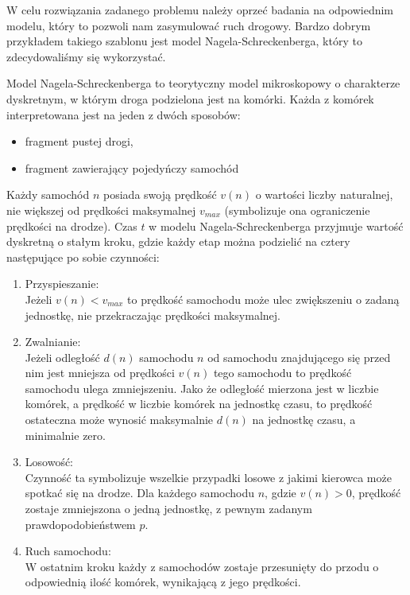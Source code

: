 \documentclass[a4paper,12pt]{article}
\begin{document}
	W celu rozwiązania zadanego problemu należy oprzeć badania na odpowiednim modelu, który to pozwoli nam zasymulować ruch drogowy. Bardzo dobrym przykładem takiego szablonu jest model Nagela-Schreckenberga, który to zdecydowaliśmy się wykorzystać.
	
	Model Nagela-Schreckenberga to teorytyczny model mikroskopowy o charakterze dyskretnym, w którym droga podzielona jest na komórki. Każda z komórek interpretowana jest na jeden z dwóch sposobów:
	
	\begin{itemize}
		\item fragment pustej drogi,
		\item fragment zawierający pojedyńczy samochód
	\end{itemize}

	Każdy samochód $n$ posiada swoją prędkość $v(n)$ o wartości liczby naturalnej, nie większej od prędkości maksymalnej $v_{max}$ (symbolizuje ona ograniczenie prędkości na drodze).
	Czas $t$ w modelu Nagela-Schreckenberga przyjmuje wartość dyskretną o stałym kroku, gdzie każdy etap można podzielić na cztery następujące po sobie czynności:
	
	\begin{enumerate}
		\item Przyspieszanie: \\
		Jeżeli $v(n) < v_{max}$ to prędkość samochodu może ulec zwiększeniu o zadaną jednostkę, nie przekraczając prędkości maksymalnej.
		\item Zwalnianie: \\
		Jeżeli odległość $d(n)$ samochodu $n$ od samochodu znajdującego się przed nim jest mniejsza od prędkości $v(n)$ tego samochodu to prędkość samochodu ulega zmniejszeniu. Jako że odległość mierzona jest w liczbie komórek, a prędkość w liczbie komórek na jednostkę czasu, to prędkość ostateczna może wynosić maksymalnie $d(n)$ na jednostkę czasu, a minimalnie zero.
		\item Losowość: \\
		Czynność ta symbolizuje wszelkie przypadki losowe z jakimi kierowca może spotkać się na drodze. Dla każdego samochodu $n$, gdzie $v(n) > 0$, prędkość zostaje zmniejszona o jedną jednostkę, z pewnym zadanym prawdopodobieństwem $p$.
		\item Ruch samochodu: \\
		W ostatnim kroku każdy z samochodów zostaje przesunięty do przodu o odpowiednią ilość komórek, wynikającą z jego prędkości.
	\end{enumerate}
\end{document}
